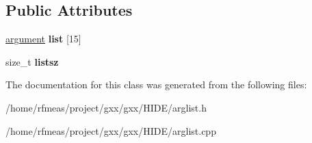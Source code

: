 \subsection*{Public Attributes}
\begin{DoxyCompactItemize}
\item 
\hyperlink{structgxx_1_1argument}{argument} {\bfseries list} \mbox{[}15\mbox{]}\hypertarget{classgxx_1_1arglist_abb42300bed2be83c7498299a602f38a6}{}\label{classgxx_1_1arglist_abb42300bed2be83c7498299a602f38a6}

\item 
size\+\_\+t {\bfseries listsz}\hypertarget{classgxx_1_1arglist_aa1d072acb37922a83edf8c2145b64c89}{}\label{classgxx_1_1arglist_aa1d072acb37922a83edf8c2145b64c89}

\end{DoxyCompactItemize}


The documentation for this class was generated from the following files\+:\begin{DoxyCompactItemize}
\item 
/home/rfmeas/project/gxx/gxx/\+H\+I\+D\+E/arglist.\+h\item 
/home/rfmeas/project/gxx/gxx/\+H\+I\+D\+E/arglist.\+cpp\end{DoxyCompactItemize}

